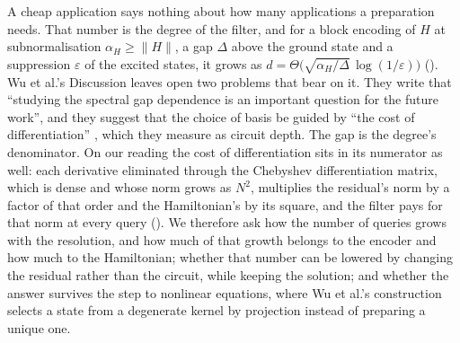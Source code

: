A cheap application says nothing about how many applications a preparation needs. That number is the degree of the filter, and for a block encoding of $H$ at subnormalisation $\alpha_H\ge\|H\|$, a gap $\Delta$ above the ground state and a suppression $\varepsilon$ of the excited states, it grows as $d=\Theta\bigl(\sqrt{\alpha_H/\Delta}\,\log(1/\varepsilon)\bigr)$ (). Wu et al.'s Discussion leaves open two problems that bear on it. They write that ``studying the spectral gap dependence is an important question for the future work'', and they suggest that the choice of basis be guided by ``the cost of differentiation'' \cite{wu2025pihm}, which they measure as circuit depth. The gap is the degree's denominator. On our reading the cost of differentiation sits in its numerator as well: each derivative eliminated through the Chebyshev differentiation matrix, which is dense and whose norm grows as $N^2$, multiplies the residual's norm by a factor of that order and the Hamiltonian's by its square, and the filter pays for that norm at every query (). We therefore ask how the number of queries grows with the resolution, and how much of that growth belongs to the encoder and how much to the Hamiltonian; whether that number can be lowered by changing the residual rather than the circuit, while keeping the solution; and whether the answer survives the step to nonlinear equations, where Wu et al.'s construction selects a state from a degenerate kernel by projection instead of preparing a unique one.

